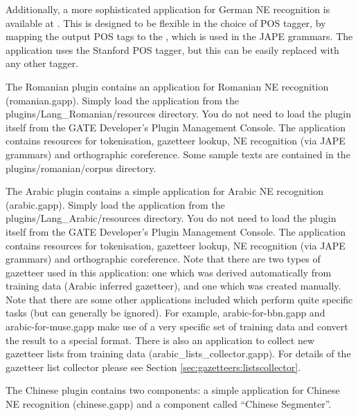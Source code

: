 Additionally, a more sophisticated application for German NE recognition is
available at .
This is designed to be flexible in the choice of POS tagger, by mapping the output POS 
tags to the , 
which is used in the JAPE grammars. The application uses the Stanford POS tagger, 
but this can be easily replaced with any other tagger.



The Romanian plugin contains an application for Romanian NE
recognition (romanian.gapp). Simply load the application from the
plugins/Lang\_Romanian/resources directory. You do not need to load the
plugin itself from the GATE Developer's Plugin
Management Console. The application
contains resources for tokenisation, gazetteer lookup, NE recognition
(via JAPE grammars) and orthographic coreference. Some sample texts
are contained in the plugins/romanian/corpus directory.



The Arabic plugin contains a simple application for Arabic NE
recognition (arabic.gapp). Simply load the application from the
plugins/Lang\_Arabic/resources directory. You do not need to load the plugin
itself from the GATE Developer's Plugin
Management Console. The application contains
resources for tokenisation, gazetteer lookup, NE recognition (via JAPE
grammars) and orthographic coreference. Note that there are two types
of gazetteer used in this application: one which was derived
automatically from training data (Arabic inferred gazetteer), and one
which was created manually. Note that there are some other
applications included which perform quite specific tasks (but can
generally be ignored). For example, arabic-for-bbn.gapp and
arabic-for-muse.gapp make use of a very specific set of training data
and convert the result to a special format. There is also an
application to collect new gazetteer lists from training data
(arabic\_lists\_collector.gapp). For details of the gazetteer list
collector please see Section \ref{sec:gazetteers:listscollector}.



The Chinese plugin contains two components: a simple application for Chinese 
NE recognition (chinese.gapp) and a component called ``Chinese Segmenter''.


